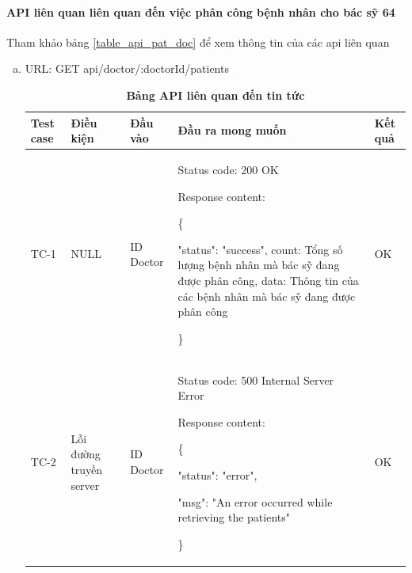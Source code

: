 \paragraph{API liên quan liên quan đến việc phân công bệnh nhân cho bác sỹ
64
}
\mbox{}

Tham khảo bảng \ref{table_api_pat_doc} để xem thông tin của các api liên quan

\begin{enumerate}[a)]
  \item URL: GET api/doctor/{:doctorId}/patients
  

  \begin{xltabular}{\textwidth}{
    | >{\raggedright\arraybackslash}m{1cm}
    | >{\raggedright\arraybackslash}X
    | >{\raggedright\arraybackslash}X
    | >{\raggedright\arraybackslash}X
    | >{\raggedright\arraybackslash}m{1cm}|
    }
    \caption{\bfseries \fontsize{12pt}{0pt}\selectfont Bảng API liên quan đến tin tức}
    \\
    \hline
    \bfseries Test case    &\bfseries Điều kiện   &\bfseries Đầu vào 
    &\bfseries Đầu ra mong muốn &\bfseries Kết quả\\ \hline
  
  
    TC-1
    & NULL
    & ID Doctor

    & 
  
    Status code: 200 OK
  
      Response content:
  
      \{
  
    "status": "success",
    count: Tổng số lượng bệnh nhân mà bác sỹ đang được phân công,
    data: Thông tin của các bệnh nhân mà bác sỹ đang được phân công
  
    \}
    
    & OK
  
    \\ \hline
  
    TC-2
    & Lỗi đường truyền server
    & ID Doctor

   &
  
    Status code: 500 Internal Server Error
  
      Response content:
  
      \{
  
    "status": "error",
  
    "msg": "An error occurred while retrieving the patients"
  
    \}
    
    & OK
  

\end{xltabular}
\end{enumerate}
